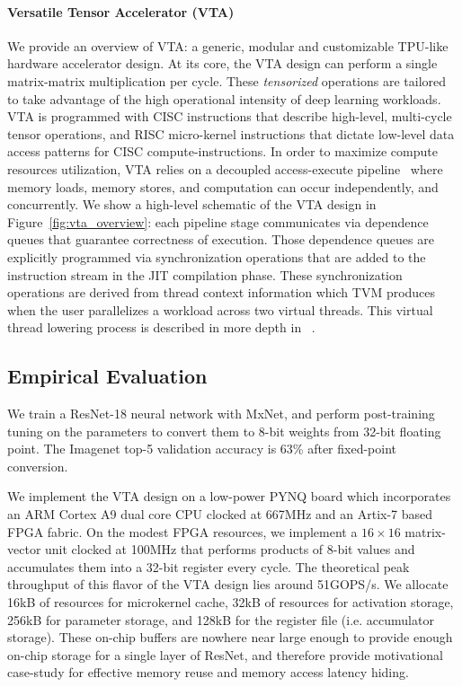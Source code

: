 \documentclass[sigconf]{acmart}
\begin{document}
\paragraph{Versatile Tensor Accelerator (VTA)}
We provide an overview of VTA: a generic, modular and customizable TPU-like hardware accelerator design.
At its core, the VTA design can perform a single matrix-matrix multiplication per cycle.
These \emph{tensorized} operations are tailored to take advantage of the high operational intensity of deep learning workloads.
VTA is programmed with CISC instructions that describe high-level, multi-cycle tensor operations, and RISC micro-kernel instructions that dictate low-level data access patterns for CISC compute-instructions.
In order to maximize compute resources utilization, VTA relies on a decoupled access-execute pipeline~\cite{Smith:DAE} where memory loads, memory stores, and computation can occur independently, and concurrently.
We show a high-level schematic of the VTA design in Figure~\ref{fig:vta_overview}: each pipeline stage communicates via dependence queues that guarantee correctness of execution.
Those dependence queues are explicitly programmed via synchronization operations that are added to the instruction stream in the JIT compilation phase.
These synchronization operations are derived from thread context information which TVM produces when the user parallelizes a workload across two virtual threads.
This virtual thread lowering process is described in more depth in ~\cite{chen:TVM}.

\subsection{Empirical Evaluation}

We train a ResNet-18 neural network with MxNet, and perform post-training tuning on the parameters to convert them to 8-bit weights from 32-bit floating point.
The Imagenet top-5 validation accuracy is 63\% after fixed-point conversion.

We implement the VTA design on a low-power PYNQ board which incorporates an ARM Cortex A9 dual core CPU clocked at 667MHz and an Artix-7 based FPGA fabric.
On the modest FPGA resources, we implement a $16\times16$ matrix-vector unit clocked at 100MHz that performs products of 8-bit values and accumulates them into a 32-bit register every cycle.
The theoretical peak throughput of this flavor of the VTA design lies around 51GOPS/s.
We allocate 16kB of resources for microkernel cache, 32kB of resources for activation storage, 256kB for parameter storage, and 128kB for the register file (i.e. accumulator storage).
These on-chip buffers are nowhere near large enough to provide enough on-chip storage for a single layer of ResNet, and therefore provide motivational case-study for effective memory reuse and memory access latency hiding.
\end{document}

